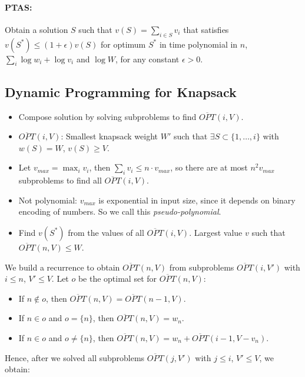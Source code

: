 \paragraph{PTAS:} Obtain a solution $S$ such that $v(S) = \sum\limits_{i \in S} v_i$ that satisfies $v(S^*) \le (1 + \epsilon) v(S)$ for optimum $S^*$ in time polynomial in $n$, $\sum\limits_{i} \log w_i + \log v_i$ and $\log W$, for any constant $\epsilon > 0$.

\subsection{Dynamic Programming for Knapsack}

\begin{itemize}
	\item Compose solution by solving subproblems to find $\overline{{OPT}}(i,V)$.
	\item $\overline{{OPT}}(i,V)$: Smallest knapsack weight $W'$ such that $\exists S \subset \{1, \ldots, i\}$ with $w(S) =W$, $v(S) \ge V$.
	\item Let $v_{max} = \max_i v_i$, then $\sum\limits_{i} v_i \le n \cdot v_{max}$, so there are at most $n^2 v_{max}$ subproblems to find all $\overline{OPT}(i, V)$.
	\item Not polynomial: $v_{max}$ is exponential in input size, since it depends on binary encoding of numbers. So we call this \emph{pseudo-polynomial}.
	\item Find $v(S^{*})$ from the values of all $\overline{OPT}(i,V)$. Largest value $v$ such that $\overline{OPT}(n,V) \le W$.
\end{itemize}

We build a recurrence to obtain $\overline{OPT}(n,V)$ from subproblems $\overline{OPT}(i,V')$ with $i \le n$, $V' \le V$. Let $o$ be the optimal set for $\overline{OPT}(n,V)$:

\begin{itemize}
	\item If $n \notin o$, then $\overline{OPT}(n,V) = \overline{OPT}(n-1,V)$.
	\item If $n \in o$ and $o = \{n\}$, then $\overline{OPT}(n,V) = w_n$.
	\item If $n \in o$ and $o \neq \{n\}$, then $\overline{OPT}(n,V) = w_n + \overline{OPT}(i-1,V - v_n)$.
\end{itemize}

Hence, after we solved all subproblems $\overline{OPT}(j,V')$ with $j \le i$, $V' \le V$, we obtain:

